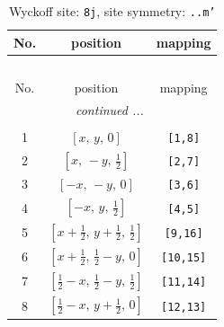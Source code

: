 \documentclass[fleqn,8pt]{jsarticle}
\begin{document}
\begin{longtable}{ccc}
\caption{Wyckoff site: {\tt 8j}, site symmetry: {\tt ..m'}}
 \\
 \hline \hline
No. & position & mapping \\ \hline \endfirsthead

\multicolumn{2}{l}{\tablename\ \thetable{}} \\
 \hline \hline
No. & position & mapping \\ \hline \endhead

 \hline \hline
\multicolumn{2}{r}{\footnotesize\it continued ...} \\ \endfoot

 \hline \hline
\multicolumn{2}{r}{} \\ \endlastfoot

1 & $\left[ x,\, y,\, 0 \right]$ & {\tt [1,8]} \\ \hline
2 & $\left[ x,\, - y,\, \frac{1}{2} \right]$ & {\tt [2,7]} \\ \hline
3 & $\left[ - x,\, - y,\, 0 \right]$ & {\tt [3,6]} \\ \hline
4 & $\left[ - x,\, y,\, \frac{1}{2} \right]$ & {\tt [4,5]} \\ \hline
5 & $\left[ x + \frac{1}{2},\, y + \frac{1}{2},\, \frac{1}{2} \right]$ & {\tt [9,16]} \\ \hline
6 & $\left[ x + \frac{1}{2},\, \frac{1}{2} - y,\, 0 \right]$ & {\tt [10,15]} \\ \hline
7 & $\left[ \frac{1}{2} - x,\, \frac{1}{2} - y,\, \frac{1}{2} \right]$ & {\tt [11,14]} \\ \hline
8 & $\left[ \frac{1}{2} - x,\, y + \frac{1}{2},\, 0 \right]$ & {\tt [12,13]} \\
\end{longtable}
\renewcommand{\arraystretch}{1.2}
\end{document}
